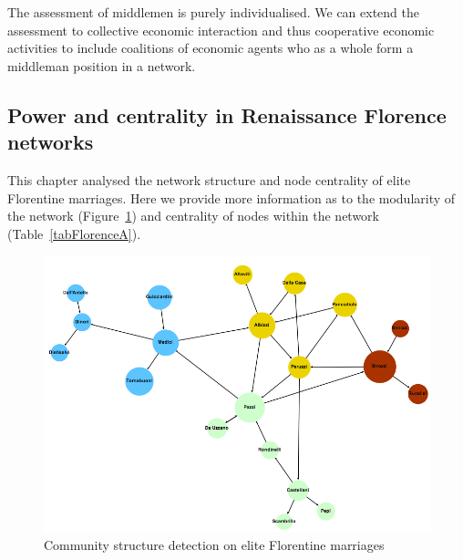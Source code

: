 The assessment of middlemen is purely individualised. We can extend the assessment to collective economic interaction and thus cooperative economic activities to include coalitions of economic agents who as a whole form a middleman position in a network.


\begin{subappendices}

\section{Power and centrality in Renaissance Florence networks} 
\label{A}

This chapter analysed the network structure and node centrality of elite Florentine marriages. Here we provide more information as to the modularity of the network (Figure~\ref{Fig:Florentinemodu}) and centrality of nodes within the network (Table~\ref{tabFlorenceA}).

\begin{figure}[h!]
\centering
\includegraphics[scale=0.4]{Images/Florentine-modu.png}
\caption{Community structure detection on elite Florentine marriages}
\label{Fig:Florentinemodu}
\end{figure}


\end{subappendices}
